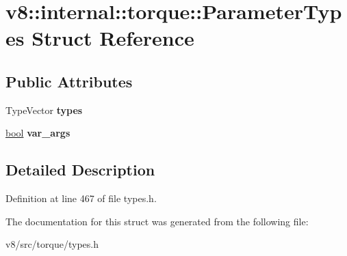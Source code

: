 \hypertarget{structv8_1_1internal_1_1torque_1_1ParameterTypes}{}\section{v8\+:\+:internal\+:\+:torque\+:\+:Parameter\+Types Struct Reference}
\label{structv8_1_1internal_1_1torque_1_1ParameterTypes}
\subsection*{Public Attributes}
\begin{DoxyCompactItemize}
\item 
\mbox{\label{structv8_1_1internal_1_1torque_1_1ParameterTypes_a498b57fbe5f0d202b64cd1b0a41bb8b9}} 
Type\+Vector {\bfseries types}
\item 
\mbox{\label{structv8_1_1internal_1_1torque_1_1ParameterTypes_a298cceb875fc665d6011c3ab78032b94}} 
\mbox{\hyperlink{classbool}{bool}} {\bfseries var\+\_\+args}
\end{DoxyCompactItemize}


\subsection{Detailed Description}


Definition at line 467 of file types.\+h.



The documentation for this struct was generated from the following file\+:\begin{DoxyCompactItemize}
\item 
v8/src/torque/types.\+h\end{DoxyCompactItemize}
